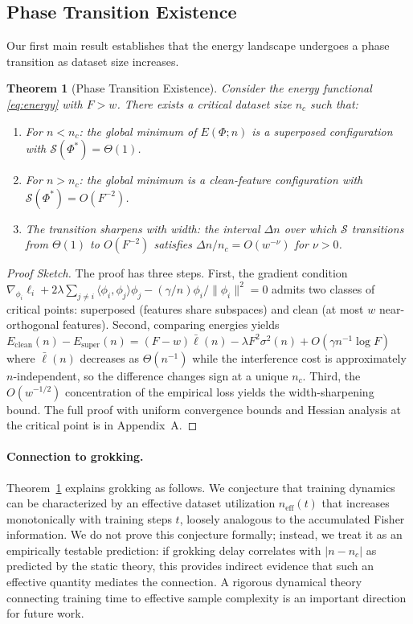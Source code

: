 \documentclass{article}
\newtheorem{theorem}{Theorem}
\newcommand{\nc}{n_c}
\newcommand{\feat}{\phi}
\newcommand{\supidx}{\mathcal{S}}
\newcommand{\Fnum}{F}
\begin{document}
\subsection{Phase Transition Existence}
\label{sec:phase_transition}

Our first main result establishes that the energy landscape undergoes a phase transition as dataset size increases.

\begin{theorem}[Phase Transition Existence]
\label{thm:phase_transition}
Consider the energy functional \eqref{eq:energy} with $\Fnum > w$.
There exists a critical dataset size $\nc$ such that:
\begin{enumerate}
    \item For $n < \nc$: the global minimum of $E(\Phi; n)$ is a superposed configuration with $\supidx(\Phi^*) = \Theta(1)$.
    \item For $n > \nc$: the global minimum is a clean-feature configuration with $\supidx(\Phi^*) = O(\Fnum^{-2})$.
    \item The transition sharpens with width: the interval $\Delta n$ over which $\supidx$ transitions from $\Theta(1)$ to $O(\Fnum^{-2})$ satisfies $\Delta n / \nc = O(w^{-\nu})$ for $\nu > 0$.
\end{enumerate}
\end{theorem}

\begin{proof}[Proof Sketch]
The proof has three steps. First, the gradient condition $\nabla_{\feat_i} \ell_i + 2\lambda \sum_{j \neq i} \langle \feat_i, \feat_j \rangle \feat_j - (\gamma/n) \feat_i / \|\feat_i\|^2 = 0$ admits two classes of critical points: superposed (features share subspaces) and clean (at most $w$ near-orthogonal features). Second, comparing energies yields $E_{\text{clean}}(n) - E_{\text{super}}(n) = (\Fnum - w)\bar{\ell}(n) - \lambda \Fnum^2 \sigma^2(n) + O(\gamma n^{-1} \log \Fnum)$ where $\bar{\ell}(n)$ decreases as $\Theta(n^{-1})$ while the interference cost is approximately $n$-independent, so the difference changes sign at a unique $\nc$. Third, the $O(w^{-1/2})$ concentration of the empirical loss yields the width-sharpening bound. The full proof with uniform convergence bounds and Hessian analysis at the critical point is in Appendix~A.
\end{proof}

\paragraph{Connection to grokking.}
Theorem~\ref{thm:phase_transition} explains grokking as follows.
We conjecture that training dynamics can be characterized by an effective dataset utilization $n_{\text{eff}}(t)$ that increases monotonically with training steps $t$, loosely analogous to the accumulated Fisher information. We do not prove this conjecture formally; instead, we treat it as an empirically testable prediction: if grokking delay correlates with $|n - \nc|$ as predicted by the static theory, this provides indirect evidence that such an effective quantity mediates the connection. A rigorous dynamical theory connecting training time to effective sample complexity is an important direction for future work.
\end{document}
